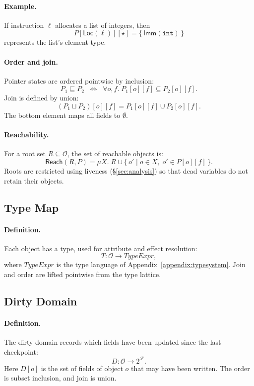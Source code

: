 \paragraph{Example.}
If instruction $\ell$ allocates a list of integers,
then
\[
P[\mathsf{Loc}(\ell)][\star] = \{\, \mathsf{Imm}(\texttt{int}) \,\}
\]
represents the list’s element type.

\paragraph{Order and join.}
Pointer states are ordered pointwise by inclusion:
\[
P_1 \sqsubseteq P_2 \;\;\iff\;\;
\forall o,f.\; P_1[o][f] \subseteq P_2[o][f].
\]
Join is defined by union:
\[
(P_1 \sqcup P_2)[o][f] = P_1[o][f] \cup P_2[o][f].
\]
The bottom element maps all fields to $\emptyset$.

\paragraph{Reachability.}
For a root set $R \subseteq \mathcal{O}$,
the set of reachable objects is:
\[
\mathsf{Reach}(R,P) = \mu X.\; R \cup \{\, o' \mid o \in X,\; o' \in P[o][f] \,\}.
\]
Roots are restricted using liveness (\S\ref{sec:analysis})
so that dead variables do not retain their objects.

\subsection{Type Map}

\paragraph{Definition.}
Each object has a type, used for attribute and effect resolution:
\[
T : \mathcal{O} \to \mathit{TypeExpr},
\]
where $\mathit{TypeExpr}$ is the type language of
Appendix~\ref{appendix:typesystem}.
Join and order are lifted pointwise from the type lattice.

\subsection{Dirty Domain}

\paragraph{Definition.}
The dirty domain records which fields have been updated since the last checkpoint:
\[
D : \mathcal{O} \to 2^{\mathcal{F}}.
\]
Here $D[o]$ is the set of fields of object $o$ that may have been written.
The order is subset inclusion, and join is union.

